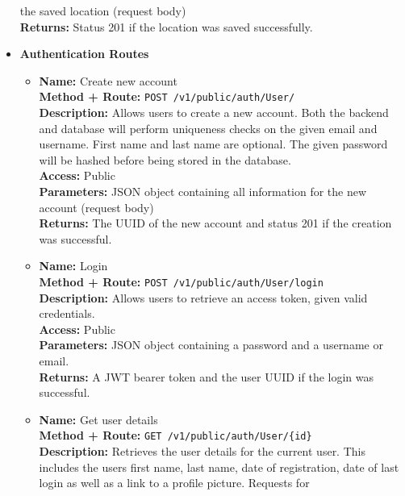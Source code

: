 \begin{itemize}
{\begin{itemize}
{        the saved location (request body)\\
        \textbf{Returns:} Status 201 if the location was saved successfully.\\
      }
    \end{itemize}
  }
  \item{
    \textbf{Authentication Routes}
    \begin{itemize}
      \item {
        \textbf{Name:} Create new account\\
        \textbf{Method + Route:} \texttt{POST /v1/public/auth/User/}\\
        \textbf{Description:} Allows users to create a new account. Both the
        backend and database will perform uniqueness checks on the given email
        and username. First name and last name are optional. The given password
        will be hashed before being stored in the database.\\
        \textbf{Access:} Public\\
        \textbf{Parameters:} JSON object containing all information for the new
        account (request body)\\
        \textbf{Returns:} The UUID of the new account and status 201 if the
        creation was successful.\\
      }
      \item {
        \textbf{Name:} Login\\
        \textbf{Method + Route:} \texttt{POST /v1/public/auth/User/login}\\
        \textbf{Description:} Allows users to retrieve an access token, given
        valid credentials.\\
        \textbf{Access:} Public\\
        \textbf{Parameters:} JSON object containing a password and a username or
        email.\\
        \textbf{Returns:} A JWT bearer token and the user UUID if the login was
        successful.\\
      }
      \item {
        \textbf{Name:} Get user details\\
        \textbf{Method + Route:} \texttt{GET /v1/public/auth/User/\{id\}}\\
        \textbf{Description:} Retrieves the user details for the current user.
        This includes the users first name, last name, date of registration,
        date of last login as well as a link to a profile picture. Requests for
}
\end{itemize}}
\end{itemize}
